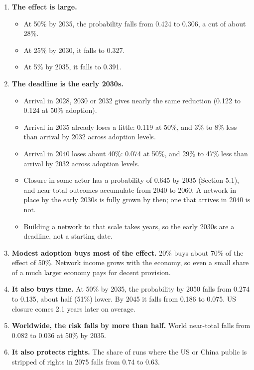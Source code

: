 \documentclass[
  10pt,
]{article}
\providecommand{\tightlist}{%
  \setlength{\itemsep}{0pt}\setlength{\parskip}{0pt}}
\begin{document}
\begin{enumerate}
\def\labelenumi{\arabic{enumi}.}
\tightlist
\item
  \textbf{The effect is large.}

  \begin{itemize}
  \tightlist
  \item
    At 50\% by 2035, the probability falls from 0.424 to 0.306, a cut of about 28\%.
  \item
    At 25\% by 2030, it falls to 0.327.
  \item
    At 5\% by 2035, it falls to 0.391.
  \end{itemize}
\item
  \textbf{The deadline is the early 2030s.}

  \begin{itemize}
  \tightlist
  \item
    Arrival in 2028, 2030 or 2032 gives nearly the same reduction (0.122 to 0.124 at 50\% adoption).
  \item
    Arrival in 2035 already loses a little: 0.119 at 50\%, and 3\% to 8\% less than arrival by 2032
    across adoption levels.
  \item
    Arrival in 2040 loses about 40\%: 0.074 at 50\%, and 29\% to 47\% less than arrival by 2032
    across adoption levels.
  \item
    Closure in some actor has a probability of 0.645 by 2035 (Section 5.1), and near-total outcomes
    accumulate from 2040 to 2060. A network in place by the early 2030s is fully grown by then; one
    that arrives in 2040 is not.
  \item
    Building a network to that scale takes years, so the early 2030s are a deadline, not a starting
    date.
  \end{itemize}
\item
  \textbf{Modest adoption buys most of the effect.} 20\% buys about 70\% of the effect of 50\%.
  Network income grows with the economy, so even a small share of a much larger economy pays for
  decent provision.
\item
  \textbf{It also buys time.} At 50\% by 2035, the probability by 2050 falls from 0.274 to 0.135,
  about half (51\%) lower. By 2045 it falls from 0.186 to 0.075. US closure comes 2.1 years later on
  average.
\item
  \textbf{Worldwide, the risk falls by more than half.} World near-total falls from 0.082 to 0.036
  at 50\% by 2035.
\item
  \textbf{It also protects rights.} The share of runs where the US or China public is stripped of
  rights in 2075 falls from 0.74 to 0.63.
\end{enumerate}
\end{document}
